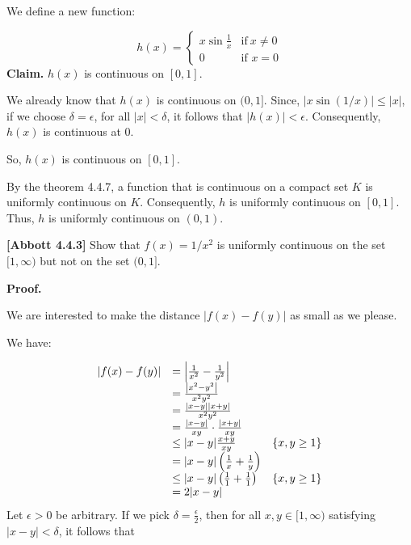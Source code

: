 \documentclass[10pt]{article}
\begin{document}
We define a new function:


\begin{equation*}
h( x) =\begin{cases}
x\sin\frac{1}{x} & \text{if} \ x\neq 0\\
0 & \text{if } x=0
\end{cases}
\end{equation*}
\textbf{Claim.} $\displaystyle h( x)$ is continuous on $\displaystyle [ 0,1]$. 



We already know that $\displaystyle h( x)$ is continuous on $\displaystyle ( 0,1]$. Since, $\displaystyle |x\sin( 1/x) |\leq |x|$, if we choose $\displaystyle \delta =\epsilon $, for all $\displaystyle |x|< \delta $, it follows that $\displaystyle |h( x) |< \epsilon $. Consequently, $\displaystyle h( x)$ is continuous at $\displaystyle 0$.



So, $\displaystyle h( x)$ is continuous on $\displaystyle [ 0,1]$. 



By the theorem 4.4.7, a function that is continuous on a compact set $\displaystyle K$ is uniformly continuous on $\displaystyle K$. Consequently, $\displaystyle h$ is uniformly continuous on $\displaystyle [ 0,1]$. Thus, $\displaystyle h$ is uniformly continuous on $\displaystyle ( 0,1)$.



\textbf{[Abbott 4.4.3] } Show that $\displaystyle f( x) =1/x^{2}$ is uniformly continuous on the set $\displaystyle [ 1,\infty )$ but not on the set $\displaystyle ( 0,1]$.



\textbf{Proof.}



We are interested to make the distance $\displaystyle |f( x) -f( y) |$ as small as we please.



We have:


\begin{equation*}
\begin{array}{ c l c }
|f( x) -f( y) | & =\left| \frac{1}{x^{2}} -\frac{1}{y^{2}}\right|  & \\
 & =\frac{\left| x^{2} -y^{2}\right| }{x^{2} y^{2}} & \\
 & =\frac{| x-y| |x+y|}{x^{2} y^{2}} & \\
 & =\frac{|x-y|}{xy} \cdot \frac{|x+y|}{xy} & \\
 & \leq |x-y|\frac{x+y}{xy} & \{x,y\geq 1\}\\
 & =|x-y|\left(\frac{1}{x} +\frac{1}{y}\right) & \\
 & \leq |x-y|\left(\frac{1}{1} +\frac{1}{1}\right) & \{x,y\geq 1\}\\
 & =2|x-y| & 
\end{array}
\end{equation*}
Let $\displaystyle \epsilon  >0$ be arbitrary. If we pick $\displaystyle \delta =\frac{\epsilon }{2}$, then for all $\displaystyle x,y\in [ 1,\infty )$ satisfying $\displaystyle |x-y|< \delta $, it follows that 
\end{document}
